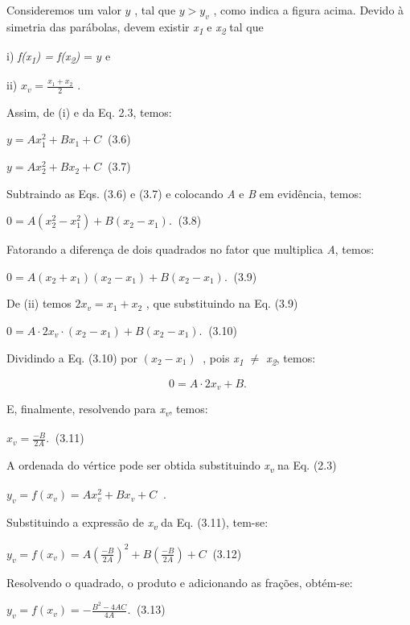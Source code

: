 Consideremos um valor  \( y \)  , tal que  \( y>y_{v} \)  , como indica a figura acima. Devido à simetria das parábolas, devem existir \textit{x\textsubscript{1}} e \textit{x\textsubscript{2}}  tal que

i) \textit{f(x\textsubscript{1}) = f(x\textsubscript{2})} =  \( y \) e

ii)    \( x_{v}=\frac{x_{1}+x_{2}}{2} \)  .    

Assim, de (i) e da Eq. 2.3, temos:

 \( y=Ax_{1}^{2}+Bx_{1}+C_{~ } \) \tab (3.6)

 \( y=Ax_{2}^{2}+Bx_{2}+C_{~ } \) \tab (3.7)

Subtraindo as Eqs. (3.6) e (3.7) e colocando \textit{A} e \textit{B} em evidência, temos:

 \( 0=A \left( x_{2}^{2}-x_{1}^{2} \right) +B \left( x_{2}-x_{1} \right) ._{~ } \) \tab (3.8)

Fatorando a diferença de dois quadrados no fator que multiplica \textit{A}, temos:

 \( 0=A \left( x_{2}+x_{1} \right)  \left( x_{2}-x_{1} \right) +B \left( x_{2}-x_{1} \right) ._{~ } \) \tab (3.9)

De (ii) temos \( 2x_{v}=x_{1}+x_{2} \) , que substituindo na Eq. (3.9)

 \( 0=A \cdot 2x_{v} \cdot  \left( x_{2}-x_{1} \right) +B \left( x_{2}-x_{1} \right) ._{~ } \)  \tab (3.10)

Dividindo a Eq. (3.10) por  \(  \left( x_{2}-x_{1} \right) _{~ } \) , pois \textit{x\textsubscript{1} $ \neq $   x\textsubscript{2}}, temos:

\[ 0=A \cdot 2x_{v}+B._{~ } \] 

E, finalmente, resolvendo para \textit{x\textsubscript{v}}, temos:

 \( x_{v}=\frac{-B}{2A}._{~ } \) \tab (3.11)

A ordenada do vértice pode ser obtida substituindo \textit{x\textsubscript{v}}  na Eq. (2.3)  

 \( y_{v}=f \left( x_{v} \right) =Ax_{v}^{2}+Bx_{v}+C_{~ } \) .

Substituindo a expressão de \textit{x\textsubscript{v}} da Eq. (3.11), tem-se: 

 \( y_{v}=f \left( x_{v} \right) =A \left( \frac{-B}{2A} \right) ^{2}+B \left( \frac{-B}{2A} \right) +C_{~ } \) \tab (3.12)

Resolvendo o quadrado, o produto e adicionando as frações, obtém-se:

 \( y_{v}=f \left( x_{v} \right) =-\frac{B^{2}-4AC}{4A}._{~ } \) \tab (3.13)

